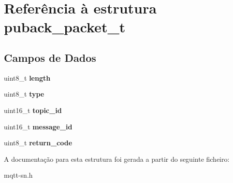 \hypertarget{structpuback__packet__t}{\section{Referência à estrutura puback\+\_\+packet\+\_\+t}
\label{structpuback__packet__t}
}
\subsection*{Campos de Dados}
\begin{DoxyCompactItemize}
\item 
\hypertarget{structpuback__packet__t_ab2b3adeb2a67e656ff030b56727fd0ac}{uint8\+\_\+t {\bfseries length}}\label{structpuback__packet__t_ab2b3adeb2a67e656ff030b56727fd0ac}

\item 
\hypertarget{structpuback__packet__t_a1d127017fb298b889f4ba24752d08b8e}{uint8\+\_\+t {\bfseries type}}\label{structpuback__packet__t_a1d127017fb298b889f4ba24752d08b8e}

\item 
\hypertarget{structpuback__packet__t_ad562f54acc5597130e0710c356963dff}{uint16\+\_\+t {\bfseries topic\+\_\+id}}\label{structpuback__packet__t_ad562f54acc5597130e0710c356963dff}

\item 
\hypertarget{structpuback__packet__t_aa9c217c6e58cdb2408e2ffbe9425289d}{uint16\+\_\+t {\bfseries message\+\_\+id}}\label{structpuback__packet__t_aa9c217c6e58cdb2408e2ffbe9425289d}

\item 
\hypertarget{structpuback__packet__t_aa72e4a685c5a553897adf56e0e60a61e}{uint8\+\_\+t {\bfseries return\+\_\+code}}\label{structpuback__packet__t_aa72e4a685c5a553897adf56e0e60a61e}

\end{DoxyCompactItemize}


A documentação para esta estrutura foi gerada a partir do seguinte ficheiro\+:\begin{DoxyCompactItemize}
\item 
mqtt-\/sn.\+h\end{DoxyCompactItemize}
